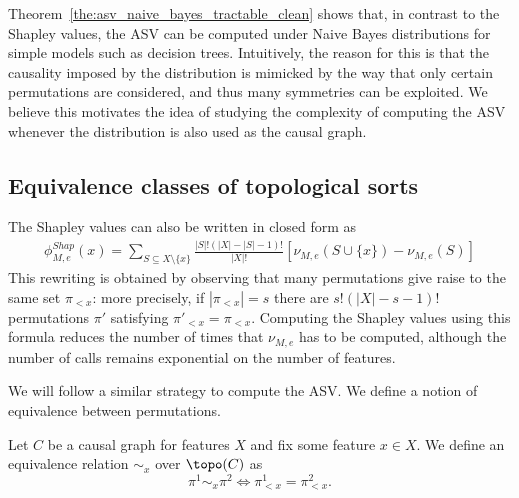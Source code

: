 Theorem~\ref{the:asv_naive_bayes_tractable_clean} shows that, in contrast to the Shapley values, the ASV can be computed under Naive Bayes distributions for simple models such as decision trees. Intuitively, the reason for this is that the causality imposed by the distribution is mimicked by the way that only certain permutations are considered,
 and thus many symmetries can be exploited. We believe this motivates the idea of studying the complexity of computing the ASV whenever the distribution is also used as the causal graph. 

\subsection{Equivalence classes of topological sorts}

The Shapley values can also be written in closed form as
%
\begin{align*}
	\phi^{Shap}_{M,e}(x) = \sum_{S \subseteq X \setminus \{x\}} \frac{|S|!(|X|-|S|-1)!}{|X|!}\left[\nu_{M,e}(S \cup \{x\}) - \nu_{M,e}(S)\right] 
\end{align*}
%
This rewriting is obtained by observing that many permutations give raise to the same set $\pi_{<x}$: more precisely, if $|\pi_{<x}| = s$ there are $s!(|X|-s-1)!$ permutations $\pi'$ satisfying $\pi'_{<x} = \pi_{<x}$. Computing the Shapley values using this formula reduces the number of times that $\nu_{M,e}$ has to be computed, although the number of calls remains
exponential on the number of features.

We will follow a similar strategy to compute the ASV. We define a notion of equivalence between permutations.

\begin{definition}\label{def:equiv_relation_left_right}
	Let $C$ be a causal graph for features $X$ and fix some feature $x \in X$. We define an equivalence relation $\sim_x$ over $\topo(C)$ as
	\[
	\pi^1 \sim_x \pi^2
	\iff
	\pi^1_{<x}=\pi^2_{<x}.
	\]
\end{definition}

